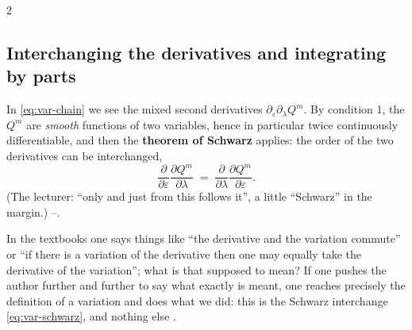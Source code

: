 \begin{paracol}{2}
\subsection{Interchanging the derivatives and integrating by parts}\label{ssec:var-parts}

In \eqref{eq:var-chain} we see the mixed second derivatives $\partial_\varepsilon\partial_\lambda Q^m$. By condition 1, the $Q^m$ are \emph{smooth} functions of two variables, hence in particular twice continuously differentiable, and then the \textbf{theorem of Schwarz} applies: the order of the two derivatives can be interchanged,
\begin{equation}\label{eq:var-schwarz}
  \frac{\partial}{\partial\varepsilon}\frac{\partial Q^m}{\partial\lambda}\;=\;\frac{\partial}{\partial\lambda}\frac{\partial Q^m}{\partial\varepsilon}.
\end{equation}
(The lecturer: ``only and just from this follows it'', a little ``Schwarz'' in the margin.) --.

\begin{coursenote}\label{cn:var-commute}
In the textbooks one says things like ``the derivative and the variation commute'' or ``if there is a variation of the derivative then one may equally take the derivative of the variation''; what is that supposed to mean? If one pushes the author further and further to say what exactly is meant, one reaches precisely the definition of a variation and does what we did: this is the Schwarz interchange \eqref{eq:var-schwarz}, and nothing else .
\end{coursenote}


\end{paracol}
